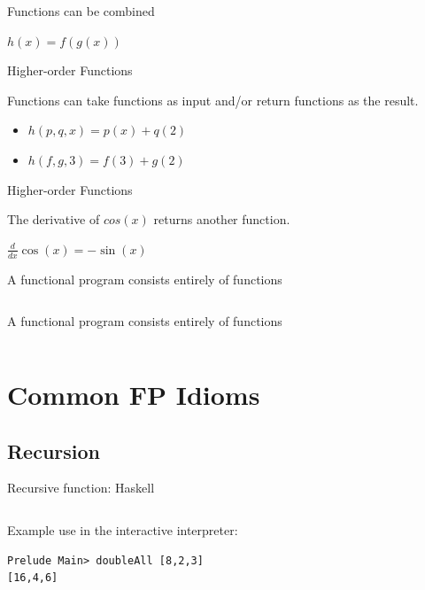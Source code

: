 \documentclass{beamer}
\begin{document}
\begin{frame}{Functions can be combined}

  {\Huge $h(x) = f(g(x))$}

\end{frame}

\begin{frame}{Higher-order Functions}

  {\Large Functions can take functions as input and/or return
    functions as the result.}

  \vskip5mm

  \begin{itemize}[<+->]
  \item {\Huge $h(p, q, x) = p(x) + q(2)$}
  \item {\Huge $h(f, g, 3) = f(3) + g(2)$}
  \end{itemize}

\end{frame}

\begin{frame}{Higher-order Functions}

  {\Large The derivative of $cos(x)$ returns another function.}

  \vskip5mm

  {\Huge $\frac{d}{dx}\cos(x) = -\sin(x)$}

\end{frame}

\begin{frame}{A functional program consists entirely of functions}

  \inputminted[firstline=5,lastline=10]{python}{code/justfunctions.py}

\end{frame}

\begin{frame}{A functional program consists entirely of functions}

  \inputminted[firstline=4]{haskell}{code/justfunctions.hs}

\end{frame}

\section{Common FP Idioms}
\subsection{Recursion}

\begin{frame}[fragile]{Recursive function: Haskell}

  \inputminted[lastline=3]{haskell}{code/doubleall_recursion.hs}

  \vskip5mm

Example use in the interactive interpreter:
  \begin{verbatim}
Prelude Main> doubleAll [8,2,3]
[16,4,6]
  \end{verbatim}

\end{frame}
\end{document}
